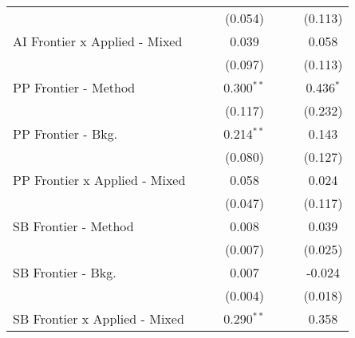 \begin{tabular}{lcccccc}
                                               &                &                & (0.054)        &                &                & (0.113)\\   
   AI Frontier x Applied - Mixed               &                &                & 0.039          &                &                & 0.058\\   
                                               &                &                & (0.097)        &                &                & (0.113)\\   
   PP Frontier - Method                        &                &                & 0.300$^{**}$   &                &                & 0.436$^{*}$\\   
                                               &                &                & (0.117)        &                &                & (0.232)\\   
   PP Frontier - Bkg.                          &                &                & 0.214$^{**}$   &                &                & 0.143\\   
                                               &                &                & (0.080)        &                &                & (0.127)\\   
   PP Frontier x Applied - Mixed               &                &                & 0.058          &                &                & 0.024\\   
                                               &                &                & (0.047)        &                &                & (0.117)\\   
   SB Frontier - Method                        &                &                & 0.008          &                &                & 0.039\\   
                                               &                &                & (0.007)        &                &                & (0.025)\\   
   SB Frontier - Bkg.                          &                &                & 0.007          &                &                & -0.024\\   
                                               &                &                & (0.004)        &                &                & (0.018)\\   
   SB Frontier x Applied - Mixed               &                &                & 0.290$^{**}$   &                &                & 0.358\\   

\end{tabular}
